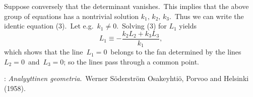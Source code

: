 \documentclass[12pt]{article}
\theoremstyle{definition}
\begin{document}
Suppose conversely that the determinant vanishes.\, This implies that the above group of equations has a nontrivial solution $k_1,\,k_2,\,k_3$.\, Thus we can write the identic equation (3).\, Let e.g.\, $k_1 \neq 0$.\, Solving (3) for $L_1$ yields
$$L_1 \equiv -\frac{k_2L_2+k_3L_3}{k_1},$$
which shows that the line\, $L_1 = 0$\, belongs to the fan determined by the lines\, $L_2 = 0$\, and\, $L_3 = 0$; so the lines pass through a common point.

\begin{thebibliography}{8}
: {\em Analyyttinen geometria}.\, Werner S\"oderstr\"om Osakeyhti\"o, Porvoo and Helsinki (1958).
\end{thebibliography} 

\end{document}
